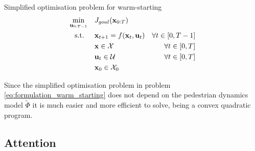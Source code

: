 \begin{problem}{Simplified \project optimisation problem for warm-starting}
\begin{align}
\min_{\mathbf{u}_{0:T-1}} \quad & J_{goal}(\mathbf{x}_{0:T}) \\
\textrm{s.t. } \quad & \mathbf{x}_{t+1} = f(\mathbf{x}_t, \mathbf{u}_t) & \forall t \in [0, T - 1] \\
& \mathbf{x} \in \mathcal{X} & \forall t \in [0, T]\\
& \mathbf{u}_t \in \mathcal{U} & \forall t \in [0, T]\\
& \mathbf{x}_0 \in \mathcal{X}_0
\end{align} 
\label{eq:formulation_warm_starting}
\end{problem}

Since the simplified optimisation problem in problem \ref{eq:formulation_warm_starting} does not depend on the pedestrian dynamics model $\tilde{\Phi}$ it is much easier and more efficient to solve, being a convex quadratic program.


\subsection{Attention}
\label{text:approach/runtime/filtering}
